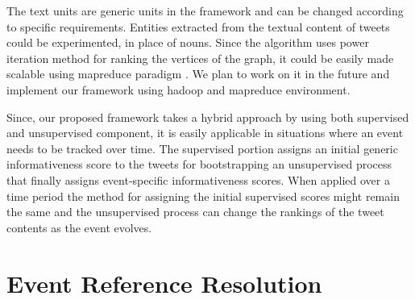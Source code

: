 The text units are generic units in the framework and can be changed according to specific requirements. Entities extracted from the textual content of tweets could be experimented, in place of nouns. Since the algorithm uses power iteration method for ranking the vertices of the graph, it could be easily made scalable using mapreduce paradigm \cite{lin2010design}. We plan to work on it in the future and implement our framework using hadoop and mapreduce environment. 

Since, our proposed framework takes a hybrid approach by using both supervised and unsupervised component, it is easily applicable in situations where an event needs to be tracked over time. The supervised portion assigns an initial generic informativeness score to the tweets for bootstrapping an unsupervised process that finally assigns event-specific informativeness scores. When applied over a time period the method for assigning the initial supervised scores might remain the same and the unsupervised process can change the rankings of the tweet contents as the event evolves. 





\section{Event Reference Resolution}


